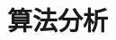 \documentclass[10pt,a4paper]{article}
\begin{document}
\title{算法分析}
\maketitle






\end{document}
